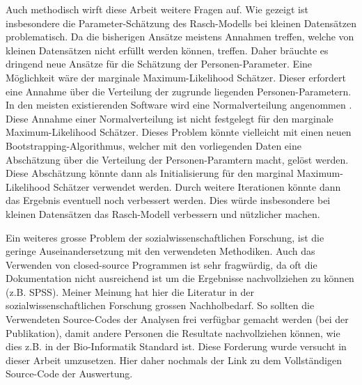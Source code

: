 Auch methodisch wirft diese Arbeit weitere Fragen auf. Wie gezeigt ist insbesondere die Parameter-Schätzung des Rasch-Modells bei kleinen Datensätzen problematisch. Da die bisherigen Ansätze meistens Annahmen treffen, welche von kleinen Datensätzen nicht erfüllt werden können, treffen. Daher bräuchte es dringend neue Ansätze für die Schätzung der Personen-Parameter. Eine Möglichkeit wäre der marginale Maximum-Likelihood Schätzer. Dieser erfordert eine Annahme über die Verteilung der zugrunde liegenden Personen-Parametern. In den meisten existierenden Software wird eine Normalverteilung angenommen \citep{Rost2004, Rizopoulos2006}. Diese Annahme einer Normalverteilung ist nicht festgelegt für den marginale Maximum-Likelihood Schätzer. Dieses Problem könnte vielleicht mit einen neuen Bootstrapping-Algorithmus, welcher mit den vorliegenden Daten eine Abschätzung über die Verteilung der Personen-Paramtern macht, gelöst werden. Diese Abschätzung könnte dann als Initialisierung für den marginal Maximum-Likelihood Schätzer verwendet werden. Durch weitere Iterationen könnte dann das Ergebnis eventuell noch verbessert werden. Dies würde insbesondere bei kleinen Datensätzen das Rasch-Modell verbessern und nützlicher machen.

Ein weiteres grosse Problem der sozialwissenschaftlichen Forschung, ist die geringe Auseinandersetzung mit den verwendeten Methodiken. Auch das Verwenden von closed-source Programmen ist sehr fragwürdig, da oft die Dokumentation nicht ausreichend ist um die Ergebnisse nachvollziehen zu können (z.B. SPSS).  Meiner Meinung hat hier die Literatur in der sozialwissenschaftlichen Forschung grossen Nachholbedarf. So sollten die Verwendeten Source-Codes der Analysen frei verfügbar gemacht werden (bei der Publikation), damit andere Personen die Resultate nachvollziehen können, wie dies z.B. in der Bio-Informatik Standard ist. Diese Forderung wurde versucht in dieser Arbeit umzusetzen. Hier daher nochmals der Link zu dem Vollständigen Source-Code der Auswertung.

